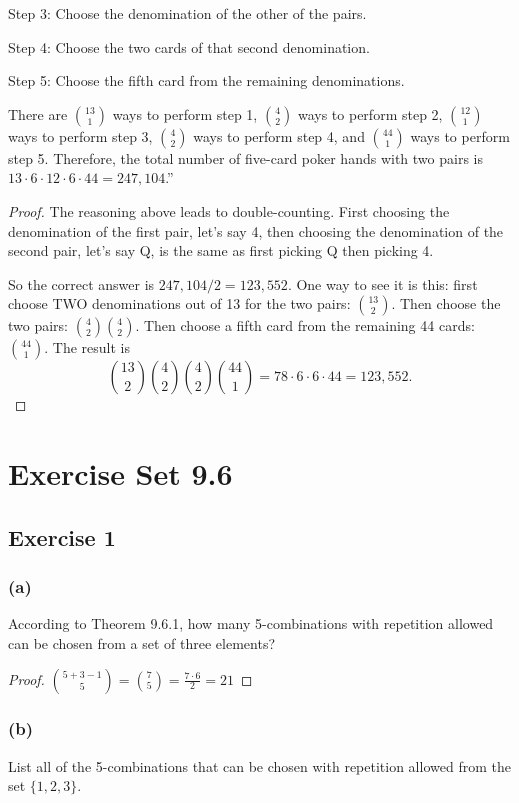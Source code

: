 \documentclass[14pt]{extarticle}
\newcommand{\dps}{\displaystyle}
\newcommand{\cy}{\color{cyan}}
\begin{document}
     {\cy Step 3:} Choose the denomination of the other of the pairs.

     {\cy Step 4:} Choose the two cards of that second denomination.

     {\cy Step 5:} Choose the fifth card from the remaining denominations.

There are \(\binom{13}{1}\) ways to perform step 1, \(\binom{4}{2}\) ways to perform step 2, \(\binom{12}{1}\) ways
to perform step 3, \(\binom{4}{2}\) ways to perform step 4, and \(\binom{44}{1}\) ways to perform step 5. Therefore, the
total number of five-card poker hands with two pairs is \(13 \cdot 6 \cdot 12 \cdot 6 \cdot 44 = 247,104\).”

\begin{proof}
     The reasoning above leads to double-counting. First choosing the denomination of the first pair, let's say 4, then choosing
     the denomination of the second pair, let's say Q, is the same as first picking Q then picking 4.

     So the correct answer is \(247,104 / 2 = 123,552\). One way to see it is this: first choose TWO denominations out of 13 for
     the two pairs: \(\binom{13}{2}\). Then choose the two pairs: \(\binom{4}{2}\binom{4}{2}\). Then choose a fifth card from the
     remaining 44 cards: \(\binom{44}{1}\). The result is
     \[
          \binom{13}{2}\binom{4}{2}\binom{4}{2}\binom{44}{1} = 78 \cdot 6 \cdot 6 \cdot 44 = 123,552.
     \]
\end{proof}

\section{Exercise Set 9.6}
\subsection{Exercise 1}
\subsubsection{(a)}
According to Theorem 9.6.1, how many 5-combinations with repetition allowed can be chosen from a set of three elements?

\begin{proof}
     \(\dps \binom{5+3-1}{5} = \binom{7}{5} = \frac{7 \cdot 6}{2} = 21\)
\end{proof}

\subsubsection{(b)}
List all of the 5-combinations that can be chosen with repetition allowed from the set \(\{1, 2, 3\}\).
\end{document}
